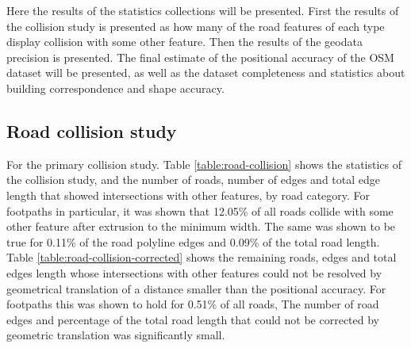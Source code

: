 \documentclass{kththesis}
\begin{document}
Here the results of the statistics collections will be presented.
First the results of the collision study is presented as how many of the road features of each type display collision with some other feature.
Then the results of the geodata precision is presented.
The final estimate of the positional accuracy of the OSM dataset will be presented, as well as the dataset completeness and statistics about building correspondence and shape accuracy.

\subsection{Road collision study}

For the primary collision study.
Table \ref{table:road-collision} shows the statistics of the collision study, and the number of roads, number of edges and total edge length that showed intersections with other features, by road category.
For footpaths in particular, it was shown that 12.05\% of all roads collide with some other feature after extrusion to the minimum width.
The same was shown to be true for 0.11\% of the road polyline edges and 0.09\% of the total road length.
Table \ref{table:road-collision-corrected} shows the remaining roads, edges and total edges length whose intersections with other features could not be resolved by geometrical translation of a distance smaller than the positional accuracy.
For footpaths this was shown to hold for 0.51\% of all roads, 
The number of road edges and percentage of the total road length that could not be corrected by geometric translation was significantly small.
\end{document}
